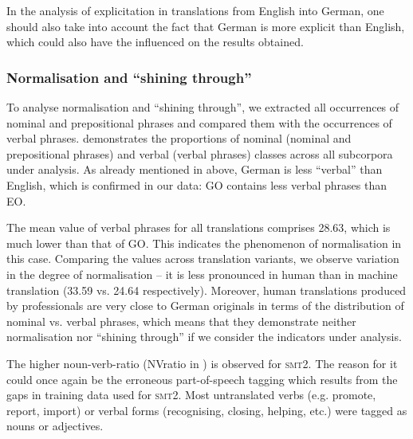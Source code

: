 \documentclass[output=paper]{LSP/langsci}
\begin{document}
In the analysis of explicitation in translations from English into German, one should also take into account the fact that German is more explicit than English, which could also have the influenced on the results obtained.

\subsubsection{Normalisation and “shining through”}
 
To analyse normalisation and “shining through”, we extracted all occurrences of nominal and prepositional phrases and compared them with the occurrences of verbal phrases.  demonstrates the proportions of nominal (nominal and prepositional phrases) and verbal (verbal phrases) classes across all subcorpora under analysis. As already mentioned in  above, German is less “verbal” than English, which is confirmed in our data: GO contains less verbal phrases than EO.

The mean value of verbal phrases for all translations comprises 28.63, which is much lower than that of GO. This indicates the phenomenon of normalisation in this case. Comparing the values across translation variants, we observe variation in the degree of normalisation – it is less pronounced in human than in machine translation (33.59 vs. 24.64 respectively).  Moreover, human translations produced by professionals are very close to German originals in terms of the distribution of nominal vs. verbal phrases, which means that they demonstrate neither normalisation nor “shining through” if we consider the indicators under analysis.

The higher noun-verb-ratio (NVratio in ) is observed for \textsc{smt}2. The reason for it could once again be the erroneous part-of-speech tagging which results from the gaps in training data used for \textsc{smt}2. Most untranslated verbs (e.g. promote, report, import) or verbal forms (recognising, closing, helping, etc.) were tagged as nouns or adjectives.
\end{document}
